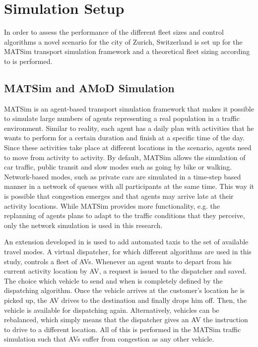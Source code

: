 \section{Simulation Setup}

In order to assess the performance of the different fleet sizes and control
algorithms a novel scenario for the city of Zurich, Switzerland is set up
for the MATSim transport simulation framework and a theoretical fleet sizing
according to \citep{spieser2014toward} is performed.


\subsection{MATSim and AMoD Simulation}

MATSim \citep{Horni2015} is an agent-based transport simulation framework that makes it possible
to simulate large numbers of agents representing a real population in a traffic environment. Similar to reality, each agent has a daily plan with activities
that he wants to perform for a certain duration and finish at a specific time of
the day. Since these activities take place at different locations in the scenario,
agents need to move from activity to activity. By default, MATSim allows the
simulation of car traffic, public transit and slow modes such as going by bike
or walking. Network-based modes, such as private cars are simulated in a time-step
based manner in a network of queues with all participants at the same time. This
way it is possible that congestion emerges and  that agents may arrive late at their
activity locations. While MATSim provides more functionality, e.g. the replanning
of agents plans to adapt to the traffic conditions that they perceive, only the
network simulation is used in this research.

An extension developed in \cite{horl_abmtrans17} is used to add automated taxis to the set
of available travel modes. A virtual dispatcher, for which
different algorithms are used in this study, controls a fleet of AVs.
Whenever an agent wants to depart from his current activity location by
AV, a request is issued to the dispatcher and saved.  The choice which vehicle to send and when is completely defined
by the dispatching algorithm. Once the vehicle arrives at the customer's location
he is picked up, the AV drives to the destination and finally drops him off. Then,
the vehicle is available for dispatching again. Alternatively, vehicles can be
rebalanced, which simply means that the dispatcher gives an AV the instruction
to drive to a different location. All of this is performed in the MATSim traffic
simulation such that AVs suffer from congestion as any other vehicle.

